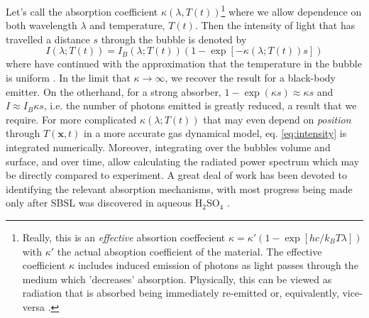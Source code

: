 \documentclass[rmp,aps,nofootinbib,superscriptaddress,floatfix]{revtex4-2}
\begin{document}
Let's call the absorption coefficient $\kappa(\lambda,T(t))$\footnote{Really, this is an \emph{effective} absortion coeffecient $\kappa = \kappa'(1-\exp\left[ hc/k_B T \lambda \right])$ with $\kappa'$ the actual absoption coefficient of the material. The effective coefficient $\kappa$ includes induced emission of photons as light passes through the medium which 'decreases' absorption. Physically, this can be viewed as radiation that is absorbed being immediately re-emitted or, equivalently, vice-versa \cite{zel2002physics,taylor1969experimental}.} where we allow dependence on both wavelength $\lambda$ and temperature, $T(t)$. Then the intensity of light that has travelled a distance $s$ through the bubble is denoted by \cite{zel2002physics}
\begin{equation}
    I(\lambda;T(t))=I_{B}(\lambda;T(t))  \left( 1-\exp \left[ -\kappa(\lambda;T(t)) s \right] \right)
    \label{eq:intensity}
\end{equation}
where have continued with the approximation that the temperature in the bubble is uniform \cite{hilgenfeldt1999sonoluminescence,hilgenfeldt1999simple}. In the limit that $\kappa\rightarrow\infty$, we recover the result for a black-body emitter. On the otherhand, for a strong absorber, $1-\exp(\kappa s)\approx\kappa s$ and $I\approx I_B \kappa s$, i.e. the number of photons emitted is greatly reduced, a result that we require. For more complicated $\kappa(\lambda;T(t))$ that may even depend on \emph{position} through $T(\bm{x},t)$ in a more accurate gas dynamical model, eq. \ref{eq:intensity} is integrated numerically. Moreover, integrating over the bubbles volume and surface, and over time, allow calculating the radiated power spectrum which may be directly compared to experiment. A great deal of work has been devoted to identifying the relevant absorption mechanisms, with most progress being made only after SBSL was discovered in aqueous H$_2$SO$_4$ \cite{hilgenfeldt1999simple,brenner2002single,hilgenfeldt1999sonoluminescence,yasui1999mechanism,flannigan2005plasma,flannigan2006measurement,suslick2008inside,an2009diagnosing,an2008spectral,an2006mechanism}. 
\end{document}
